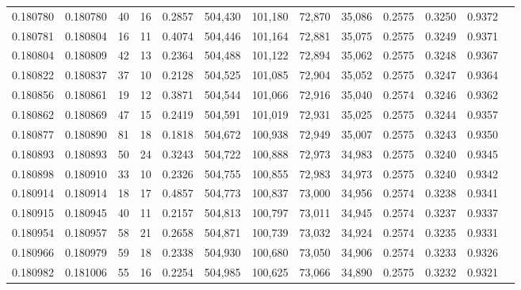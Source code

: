 \begin{tabular}{rrrrrrrrrrrrr}
0.180780 & 0.180780 &    40 &  16 &                                     0.2857 & 504,430 & 101,180 &  72,870 &  35,086 & 0.2575 & 0.3250 & 0.9372 \\
0.180781 & 0.180804 &    16 &  11 &                                     0.4074 & 504,446 & 101,164 &  72,881 &  35,075 & 0.2575 & 0.3249 & 0.9371 \\
0.180804 & 0.180809 &    42 &  13 &                                     0.2364 & 504,488 & 101,122 &  72,894 &  35,062 & 0.2575 & 0.3248 & 0.9367 \\
0.180822 & 0.180837 &    37 &  10 &                                     0.2128 & 504,525 & 101,085 &  72,904 &  35,052 & 0.2575 & 0.3247 & 0.9364 \\
0.180856 & 0.180861 &    19 &  12 &                                     0.3871 & 504,544 & 101,066 &  72,916 &  35,040 & 0.2574 & 0.3246 & 0.9362 \\
0.180862 & 0.180869 &    47 &  15 &                                     0.2419 & 504,591 & 101,019 &  72,931 &  35,025 & 0.2575 & 0.3244 & 0.9357 \\
0.180877 & 0.180890 &    81 &  18 &                                     0.1818 & 504,672 & 100,938 &  72,949 &  35,007 & 0.2575 & 0.3243 & 0.9350 \\
0.180893 & 0.180893 &    50 &  24 &                                     0.3243 & 504,722 & 100,888 &  72,973 &  34,983 & 0.2575 & 0.3240 & 0.9345 \\
0.180898 & 0.180910 &    33 &  10 &                                     0.2326 & 504,755 & 100,855 &  72,983 &  34,973 & 0.2575 & 0.3240 & 0.9342 \\
0.180914 & 0.180914 &    18 &  17 &                                     0.4857 & 504,773 & 100,837 &  73,000 &  34,956 & 0.2574 & 0.3238 & 0.9341 \\
0.180915 & 0.180945 &    40 &  11 &                                     0.2157 & 504,813 & 100,797 &  73,011 &  34,945 & 0.2574 & 0.3237 & 0.9337 \\
0.180954 & 0.180957 &    58 &  21 &                                     0.2658 & 504,871 & 100,739 &  73,032 &  34,924 & 0.2574 & 0.3235 & 0.9331 \\
0.180966 & 0.180979 &    59 &  18 &                                     0.2338 & 504,930 & 100,680 &  73,050 &  34,906 & 0.2574 & 0.3233 & 0.9326 \\
0.180982 & 0.181006 &    55 &  16 &                                     0.2254 & 504,985 & 100,625 &  73,066 &  34,890 & 0.2575 & 0.3232 & 0.9321 \\

\end{tabular}
